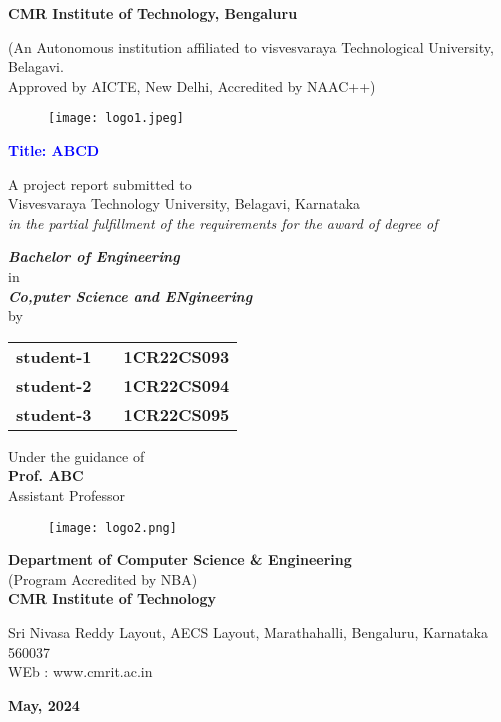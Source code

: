 \documentclass{article}
\newlength{\toptafiddle}
\newlength{\bottafiddle}
\begin{document}
\begin{titlingpage}

\thispagestyle{empty}
\centering
\setlength{\toptafiddle}{1in}
\setlength{\bottafiddle}{1in}
\vspace*{-0.75in}
\begin{LARGE}
\textbf{CMR Institute of Technology, Bengaluru}\\
\end{LARGE}

\begin{small}
(An Autonomous institution affiliated to visvesvaraya Technological University, Belagavi.\\ Approved by AICTE, New Delhi, Accredited by NAAC++)
\end{small}

\begin{figure}[h]
	\centering
	\texttt{[image: logo1.jpeg]}
\end{figure}

\vfill
\Large{\textbf{\textcolor{blue}{Title: ABCD}}}\\
\vfill
\begin{small}
A project report submitted to \\Visvesvaraya Technology University, Belagavi, Karnataka\\
\textit{in the partial fulfillment of the requirements for the award of degree of}\\
\end{small}
\begin{normalsize}
\textbf{\textit{Bachelor of Engineering}}\\
in \\
\textbf{\textit{Co,puter Science and ENgineering}}\\
by \\
\end{normalsize}
\vfill
\begin{tabular}{ccc}
\textbf{student-1 }& & \textbf{1CR22CS093}\\
\textbf{student-2 }& & \textbf{1CR22CS094}\\
\textbf{student-3 }& & \textbf{1CR22CS095}\\

\end{tabular}
\vfill
{\normalsize Under the guidance of}\\
\Large{\textbf{Prof. ABC}}\\
Assistant Professor\\
\vfill
\begin{figure}[h]
	\centering
	\texttt{[image: logo2.png]}
\end{figure}
\textbf{Department of Computer Science \& Engineering}\\
{\normalsize (Program Accredited by NBA)}\\
\textbf{CMR Institute of Technology}\\
\begin{normalsize}
Sri Nivasa Reddy Layout, AECS Layout, Marathahalli, Bengaluru, Karnataka 560037\\
WEb : www.cmrit.ac.in \\
\end{normalsize}
\textbf{May, 2024}
\end{titlingpage}
\end{document}
